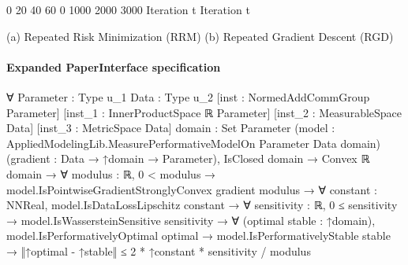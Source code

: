 \documentclass[10pt]{article}
\begin{document}
\begin{ReviewVerbatim}
                                     0       20          40       60                                          0        1000          2000        3000
                                                   Iteration t                                                             Iteration t

                                 (a) Repeated Risk Minimization (RRM)                                     (b) Repeated Gradient Descent (RGD)
\end{ReviewVerbatim}



\paragraph{Expanded PaperInterface specification}
\begin{ReviewVerbatim}
∀ {Parameter : Type u_1} {Data : Type u_2} [inst : NormedAddCommGroup Parameter]
  [inst_1 : InnerProductSpace ℝ Parameter] [inst_2 : MeasurableSpace Data] [inst_3 : MetricSpace Data]
  {domain : Set Parameter} (model : AppliedModelingLib.MeasurePerformativeModelOn Parameter Data domain)
  (gradient : Data → ↑domain → Parameter),
  IsClosed domain →
    Convex ℝ domain →
      ∀ {modulus : ℝ},
        0 < modulus →
          model.IsPointwiseGradientStronglyConvex gradient modulus →
            ∀ {constant : NNReal},
              model.IsDataLossLipschitz constant →
                ∀ {sensitivity : ℝ},
                  0 ≤ sensitivity →
                    model.IsWassersteinSensitive sensitivity →
                      ∀ (optimal stable : ↑domain),
                        model.IsPerformativelyOptimal optimal →
                          model.IsPerformativelyStable stable →
                            ‖↑optimal - ↑stable‖ ≤ 2 * ↑constant * sensitivity / modulus
\end{ReviewVerbatim}
\end{document}
